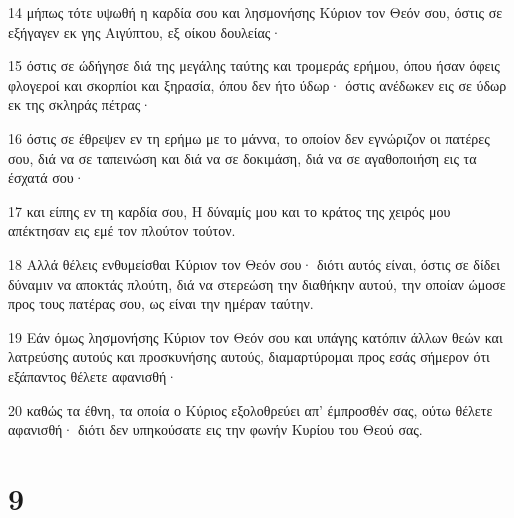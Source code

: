 \par 14 μήπως τότε υψωθή η καρδία σου και λησμονήσης Κύριον τον Θεόν σου, όστις σε εξήγαγεν εκ γης Αιγύπτου, εξ οίκου δουλείας·
\par 15 όστις σε ώδήγησε διά της μεγάλης ταύτης και τρομεράς ερήμου, όπου ήσαν όφεις φλογεροί και σκορπίοι και ξηρασία, όπου δεν ήτο ύδωρ· όστις ανέδωκεν εις σε ύδωρ εκ της σκληράς πέτρας·
\par 16 όστις σε έθρεψεν εν τη ερήμω με το μάννα, το οποίον δεν εγνώριζον οι πατέρες σου, διά να σε ταπεινώση και διά να σε δοκιμάση, διά να σε αγαθοποιήση εις τα έσχατά σου·
\par 17 και είπης εν τη καρδία σου, Η δύναμίς μου και το κράτος της χειρός μου απέκτησαν εις εμέ τον πλούτον τούτον.
\par 18 Αλλά θέλεις ενθυμείσθαι Κύριον τον Θεόν σου· διότι αυτός είναι, όστις σε δίδει δύναμιν να αποκτάς πλούτη, διά να στερεώση την διαθήκην αυτού, την οποίαν ώμοσε προς τους πατέρας σου, ως είναι την ημέραν ταύτην.
\par 19 Εάν όμως λησμονήσης Κύριον τον Θεόν σου και υπάγης κατόπιν άλλων θεών και λατρεύσης αυτούς και προσκυνήσης αυτούς, διαμαρτύρομαι προς εσάς σήμερον ότι εξάπαντος θέλετε αφανισθή·
\par 20 καθώς τα έθνη, τα οποία ο Κύριος εξολοθρεύει απ' έμπροσθέν σας, ούτω θέλετε αφανισθή· διότι δεν υπηκούσατε εις την φωνήν Κυρίου του Θεού σας.

\chapter{9}

